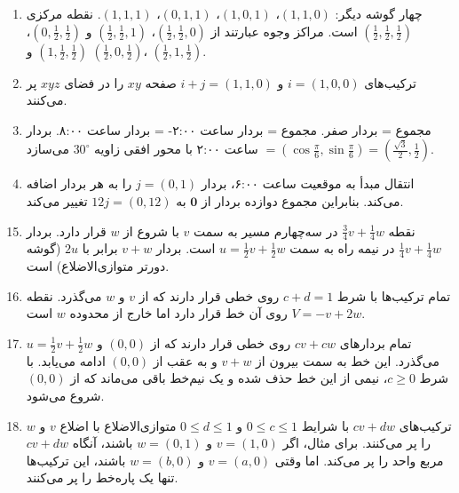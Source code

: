 \documentclass[12pt,a4paper]{article}
\begin{document}
{\begin{enumerate}
			\item چهار گوشه دیگر: $(1,1,0)$، $(1,0,1)$، $(0,1,1)$، $(1,1,1)$. نقطه مرکزی $(\frac{1}{2}, \frac{1}{2}, \frac{1}{2})$ است. مراکز وجوه عبارتند از $(\frac{1}{2}, \frac{1}{2}, 0)$، $(\frac{1}{2}, \frac{1}{2}, 1)$ و $(0, \frac{1}{2}, \frac{1}{2})$، $(1, \frac{1}{2}, \frac{1}{2})$ و $(\frac{1}{2}, 0, \frac{1}{2})$، $(\frac{1}{2}, 1, \frac{1}{2})$.
			
			\item ترکیب‌های $i=(1,0,0)$ و $i+j=(1,1,0)$ صفحه $xy$ را در فضای $xyz$ پر می‌کنند.
			
			\item مجموع = بردار صفر. مجموع = بردار ساعت ۲:۰۰- = بردار ساعت ۸:۰۰. بردار ساعت ۲:۰۰ با محور افقی زاویه $30^\circ$ می‌سازد $=(\cos\frac{\pi}{6}, \sin\frac{\pi}{6})=(\frac{\sqrt{3}}{2}, \frac{1}{2})$.
			
			\item انتقال مبدأ به موقعیت ساعت ۶:۰۰، بردار $j=(0,1)$ را به هر بردار اضافه می‌کند. بنابراین مجموع دوازده بردار از $\mathbf{0}$ به $12j=(0,12)$ تغییر می‌کند.
		\end{enumerate}
		
	
		\begin{enumerate}
			\setcounter{enumi}{14} %
			\item نقطه $\frac{3}{4}v + \frac{1}{4}w$ در سه‌چهارم مسیر به سمت $v$ با شروع از $w$ قرار دارد. بردار $\frac{1}{4}v + \frac{1}{4}w$ در نیمه راه به سمت $u=\frac{1}{2}v+\frac{1}{2}w$ است. بردار $v+w$ برابر با $2u$ (گوشه دورتر متوازی‌الاضلاع) است.
			
			\item تمام ترکیب‌ها با شرط $c+d=1$ روی خطی قرار دارند که از $v$ و $w$ می‌گذرد. نقطه $V=-v+2w$ روی آن خط قرار دارد اما خارج از محدوده $w$ است.
			
			\item تمام بردارهای $cv+cw$ روی خطی قرار دارند که از $(0,0)$ و $u=\frac{1}{2}v+\frac{1}{2}w$ می‌گذرد. این خط به سمت بیرون از $v+w$ و به عقب از $(0,0)$ ادامه می‌یابد. با شرط $c \ge 0$، نیمی از این خط حذف شده و یک نیم‌خط باقی می‌ماند که از $(0,0)$ شروع می‌شود.
			
			\item ترکیب‌های $cv+dw$ با شرایط $0 \le c \le 1$ و $0 \le d \le 1$ متوازی‌الاضلاع با اضلاع $v$ و $w$ را پر می‌کنند. برای مثال، اگر $v=(1,0)$ و $w=(0,1)$ باشند، آنگاه $cv+dw$ مربع واحد را پر می‌کند. اما وقتی $v=(a,0)$ و $w=(b,0)$ باشند، این ترکیب‌ها تنها یک پاره‌خط را پر می‌کنند.
			

\end{enumerate}}
\end{document}
